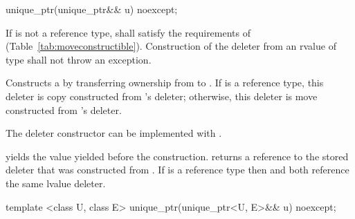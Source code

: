 %
\begin{itemdecl}
unique_ptr(unique_ptr&& u) noexcept;
\end{itemdecl}

\begin{itemdescr}
\pnum
\requires If  is not a reference type,
 shall satisfy the requirements of 
(Table~\ref{tab:moveconstructible}).
Construction
of the deleter from an rvalue of type  shall not
throw an exception.

\pnum
\effects Constructs a  by transferring ownership from
 to . If  is a reference type, this
deleter is copy constructed from 's deleter; otherwise, this
deleter is move constructed from 's deleter. \begin{note} The
deleter constructor can be implemented with . \end{note}

\pnum
\postconditions {} yields the value 
yielded before the construction.  returns a reference
to the stored deleter that was constructed from
. If  is a reference type then
 and  both reference
the same lvalue deleter.
\end{itemdescr}

%
\begin{itemdecl}
template <class U, class E> unique_ptr(unique_ptr<U, E>&& u) noexcept;
\end{itemdecl}

